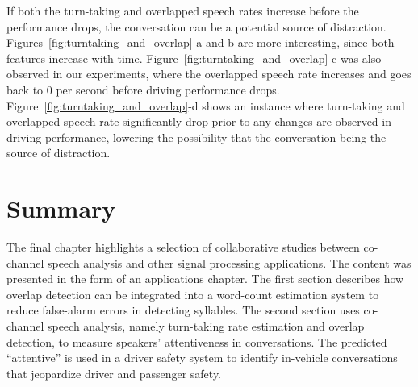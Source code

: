 \newpage
If both the turn-taking and overlapped speech rates increase before the performance drops, the conversation can be a potential source of distraction. 
Figures~\ref{fig:turntaking_and_overlap}-a and b are more interesting, since both features increase with time. 
Figure~\ref{fig:turntaking_and_overlap}-c was also observed in our experiments, where the overlapped speech rate increases and goes back to $0$ per second before driving performance drops. 
Figure~\ref{fig:turntaking_and_overlap}-d shows an instance where turn-taking and overlapped speech rate significantly drop prior to any changes are observed in driving performance, lowering the possibility that the conversation being the source of distraction. 

\section{Summary}
\label{sec:ch4_summary}
The final chapter highlights a selection of collaborative studies between co-channel speech analysis and other signal processing applications. 
The content was presented in the form of an applications chapter. 
The first section describes how overlap detection can be integrated into a word-count estimation system to reduce false-alarm errors in detecting syllables. 
The second section uses co-channel speech analysis, namely turn-taking rate estimation and overlap detection, to measure speakers' attentiveness in conversations. 
The predicted ``attentive'' is used in a driver safety system to identify in-vehicle conversations that jeopardize driver and passenger safety. 
